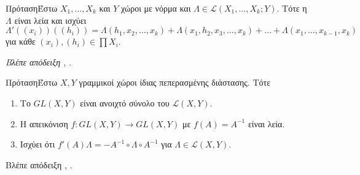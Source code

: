 \begin{namedthrm}{Πρόταση}Έστω $X_1,\ldots,X_k$ και $Y$ χώροι με νόρμα και 
    $\Lambda \in \mathcal{L}(X_1,\ldots,X_k; Y)$. Τότε η $\Lambda$ είναι λεία 
    και ισχύει 
    \begin{equation*}
        \Lambda'\left((x_i)\right)\left((h_i)\right) = \Lambda(h_1, x_2,\ldots,
         x_k) + \Lambda(x_1, h_2, x_3, \ldots, x_k) + \ldots + \Lambda(x_1,
          \ldots, x_{k-1}, x_k) 
    \end{equation*}
    για κάθε $(x_i),(h_i) \in \prod X_i$.
\end{namedthrm}
\noindent\textit{Βλέπε απόδειξη} \textit{\cite{abraham_marsden_88:manifolds}, 
\cite{cartan_71:diff_calculus}}.

\begin{namedthrm}{Πρόταση}Έστω $ X, Y$ γραμμικοί χώροι ίδιας πεπερασμένης 
    διάστασης. Τότε
    \begin{enumerate}
        \item Το $GL(X, Y)$ είναι ανοιχτό σύνολο του $\mathcal{L}(X,Y)$.
        \item Η απεικόνιση $f:GL(X,Y) \rightarrow GL(X,Y)$ με $f\left(A\right)
          = A^{-1}$ είναι λεία.
        \item Ισχύει ότι $f'\left(A\right)\Lambda = -A^{-1} \circ \Lambda \circ
        A^{-1}$ για $\Lambda \in \mathcal{L}(X, Y)$.
    \end{enumerate}
    Βλέπε απόδειξη \cite{abraham_marsden_88:manifolds}, 
    \cite{cartan_71:diff_calculus}.
    \label{ctl:sen3}
\end{namedthrm}